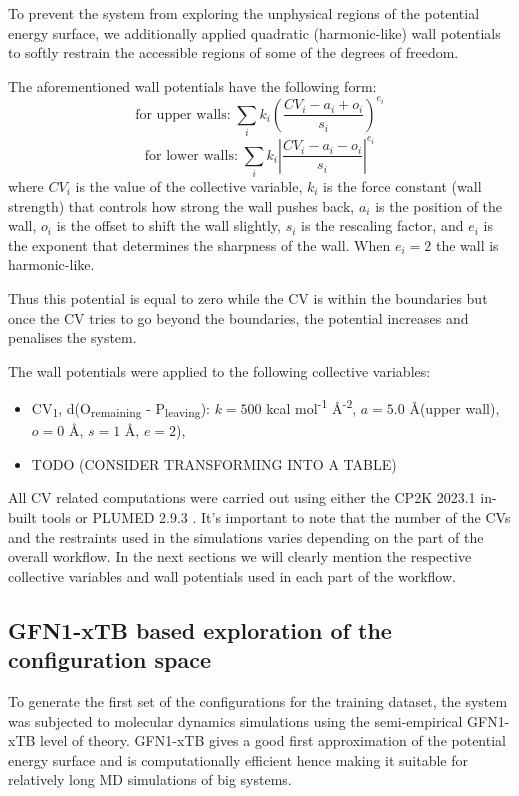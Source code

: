 To prevent the system from exploring the unphysical regions of the potential energy surface, we additionally applied quadratic (harmonic-like) wall potentials to softly restrain the accessible regions of some of the degrees of freedom. 

The aforementioned wall potentials have the following form:
\begin{equation}
    \text{for upper walls:} \; \sum_i k_i \left( \frac{CV_i - a_i + o_i}{s_i} \right)^{e_i}
    \label{eq:upper_wall}
\end{equation}
\begin{equation}
    \text{for lower walls:} \; \sum_i k_i \left| \frac{CV_i - a_i - o_i}{s_i} \right|^{e_i}
    \label{eq:lower_wall}
\end{equation}
where $CV_i$ is the value of the collective variable, $k_i$ is the force constant (wall strength) that controls how strong the wall pushes back, $a_i$ is the position of the wall, $o_i$ is the offset to shift the wall slightly, $s_i$ is the rescaling factor, and $e_i$ is the exponent that determines the sharpness of the wall. When $e_i = 2$ the wall is harmonic-like. 

Thus this potential is equal to zero while the CV is within the boundaries but once the CV tries to go beyond the boundaries, the potential increases and penalises the system.

The wall potentials were applied to the following collective variables:
\begin{itemize}
    \item CV\textsubscript{1}, d(O\textsubscript{remaining} - P\textsubscript{leaving}): $k = 500$ kcal mol\textsuperscript{-1} \AA\textsuperscript{-2}, $a = 5.0$ \AA (upper wall), $o = 0$ \AA, $s = 1$ \AA, $e = 2$),
    \item TODO (CONSIDER TRANSFORMING INTO A TABLE)
\end{itemize}

All CV related computations were carried out using either the CP2K 2023.1 in-built tools \citep{kuhneCP2KElectronicStructure2020} or PLUMED 2.9.3 \citep{tribelloPLUMED2New2014}. It's important to note that the number of the CVs and the restraints used in the simulations varies depending on the part of the overall workflow. In the next sections we will clearly mention the respective collective variables and wall potentials used in each part of the workflow.



\subsection{GFN1-xTB based exploration of the configuration space}
To generate the first set of the configurations for the training dataset, the system was subjected to molecular dynamics simulations using the semi-empirical GFN1-xTB \citep{grimmeRobustAccurateTightBinding2017} level of theory. GFN1-xTB gives a good first approximation of the potential energy surface and is computationally efficient hence making it suitable for relatively long MD simulations of big systems. 

